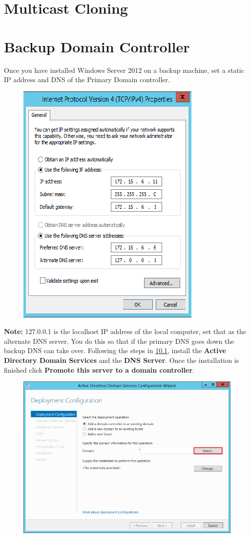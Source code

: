 \documentclass{article}
\begin{document}
\section{Multicast Cloning}
\section{Backup Domain Controller}
Once you have installed Windows Server 2012 on a backup machine, set a static IP address and DNS of the Primary Domain controller. 
\begin{figure}[h]
	\centering
	\includegraphics[width=0.35\linewidth, height=.35\textheight]{BDC/1}
\end{figure}
\newline \textbf{Note:} 127.0.0.1 is the localhost IP address of the local computer, set that as the alternate DNS server. You do this so that if the primary DNS goes down the backup DNS can take over.
\newpage Following the steps in \hyperref[sec:10.1]{10.1}, install the \textbf{Active Directory Domain Services} and the \textbf{DNS Server}. Once the installation is finished click \textbf{Promote this server to a domain controller}.
\begin{figure}[h]
	\centering
	\includegraphics[width=.5\linewidth, height=.25\textheight]{BDC/1b}
\end{figure}
\end{document}
